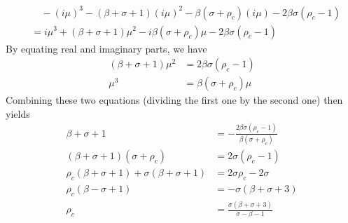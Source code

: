 \begin{align*}
&\quad -(i\mu)^3 - (\beta + \sigma + 1)(i\mu)^2 -\beta(\sigma + \rho_c)(i\mu) - 2 \beta\sigma(\rho_c - 1) \\
&= i\mu^3 + (\beta + \sigma + 1)\mu^2 -i\beta(\sigma + \rho_c)\mu - 2 \beta\sigma(\rho_c - 1)
\end{align*}
By equating real and imaginary parts, we have
\begin{align*}
(\beta + \sigma + 1)\mu^2 &= 2 \beta\sigma(\rho_c - 1) \\
\mu^3 &= \beta(\sigma + \rho_c)\mu 
\end{align*}
Combining these two equations (dividing the first one by the second one) then yields
\begin{align}
\beta + \sigma + 1 &= -\frac{2 \beta\sigma(\rho_c - 1)}{\beta(\sigma + \rho_c)} \nonumber \\
(\beta + \sigma + 1)(\sigma + \rho_c) &= 2 \sigma(\rho_c - 1) \nonumber \\
\rho_c(\beta + \sigma + 1) + \sigma(\beta + \sigma + 1) &= 2 \sigma\rho_c - 2\sigma  \nonumber \\
\rho_c(\beta - \sigma + 1) &= -\sigma(\beta + \sigma + 3)  \nonumber \\
\rho_c &= \frac{\sigma(\beta + \sigma + 3)}{\sigma - \beta - 1} \label{eqn:lorezncrit}
\end{align}
